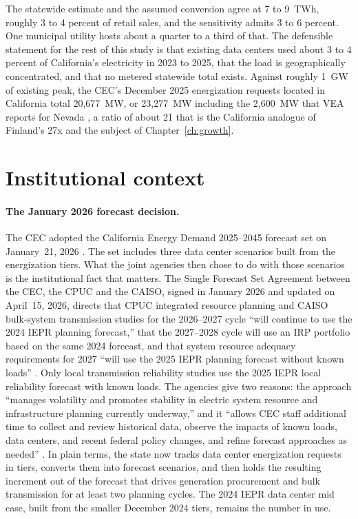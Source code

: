 The statewide estimate and the assumed conversion agree at 7 to 9~TWh, roughly 3 to 4 percent of retail sales, and the sensitivity admits 3 to 6 percent. One municipal utility hosts about a quarter to a third of that. The defensible statement for the rest of this study is that existing data centers used about 3 to 4 percent of California's electricity in 2023 to 2025, that the load is geographically concentrated, and that no metered statewide total exists. Against roughly 1~GW of existing peak, the CEC's December 2025 energization requests located in California total 20,677~MW, or 23,277~MW including the 2,600~MW that VEA reports for Nevada \citep{cec_dc_memo2026}, a ratio of about 21 that is the California analogue of Finland's 27x \citep{manner2026} and the subject of Chapter~\ref{ch:growth}.

\section{Institutional context}
\label{sec:institutions}

\paragraph{The January 2026 forecast decision.} The CEC adopted the California Energy Demand 2025--2045 forecast set on January~21, 2026 \citep{cec_ced2025}. The set includes three data center scenarios built from the energization tiers. What the joint agencies then chose to do with those scenarios is the institutional fact that matters. The Single Forecast Set Agreement between the CEC, the CPUC and the CAISO, signed in January 2026 and updated on April~15, 2026, directs that CPUC integrated resource planning and CAISO bulk-system transmission studies for the 2026--2027 cycle ``will continue to use the 2024 IEPR planning forecast,'' that the 2027--2028 cycle will use an IRP portfolio based on the same 2024 forecast, and that system resource adequacy requirements for 2027 ``will use the 2025 IEPR planning forecast without known loads'' \citep[pp.~7--8]{sfsa2026}. Only local transmission reliability studies use the 2025 IEPR local reliability forecast with known loads. The agencies give two reasons: the approach ``manages volatility and promotes stability in electric system resource and infrastructure planning currently underway,'' and it ``allows CEC staff additional time to collect and review historical data, observe the impacts of known loads, data centers, and recent federal policy changes, and refine forecast approaches as needed'' \citep[p.~8]{sfsa2026}. In plain terms, the state now tracks data center energization requests in tiers, converts them into forecast scenarios, and then holds the resulting increment out of the forecast that drives generation procurement and bulk transmission for at least two planning cycles. The 2024 IEPR data center mid case, built from the smaller December 2024 tiers, remains the number in use.

